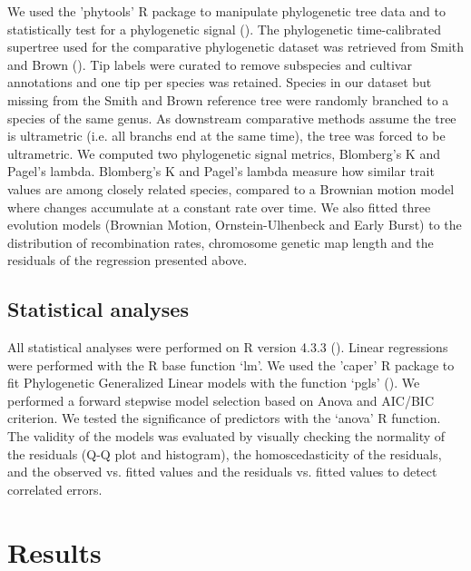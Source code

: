 \documentclass{article}
\begin{document}
We used the 'phytools' R package to manipulate phylogenetic tree data and to statistically test for a phylogenetic signal (\cite{revellPhytoolsUpdatedEcosystem2024}). The phylogenetic time-calibrated supertree used for the comparative phylogenetic dataset was retrieved from Smith and Brown (\cite{smithConstructingBroadlyInclusive2018}). Tip labels were curated to remove subspecies and cultivar annotations and one tip per species was retained. Species in our dataset but missing from the Smith and Brown reference tree were randomly branched to a species of the same genus. As downstream comparative methods assume the tree is ultrametric (i.e. all branchs end at the same time), the tree was forced to be ultrametric. We computed two phylogenetic signal metrics, Blomberg's K and Pagel's lambda. Blomberg's K and Pagel's lambda measure how similar trait values are among closely related species, compared to a Brownian motion model where changes accumulate at a constant rate over time. We also fitted three evolution models (Brownian Motion, Ornstein-Ulhenbeck and Early Burst) to the distribution of recombination rates, chromosome genetic map length and the residuals of the regression presented above.


\subsection*{Statistical analyses}



All statistical analyses were performed on R version 4.3.3 (\cite{rcoreteamLanguageEnvironmentStatistical2022}). Linear regressions were performed with the R base function ‘lm’. We used the 'caper' R package to fit Phylogenetic Generalized Linear models with the function ‘pgls’ (\cite{ormeCaperComparativeAnalyses2018}). We performed a forward stepwise model selection based on Anova and AIC/BIC criterion. We tested the significance of predictors with the ‘anova’ R function. The validity of the models was evaluated by visually checking the normality of the residuals (Q-Q plot and histogram), the homoscedasticity of the residuals, and the observed vs. fitted values and the residuals vs. fitted values to detect correlated errors.





\section*{Results}
\end{document}
